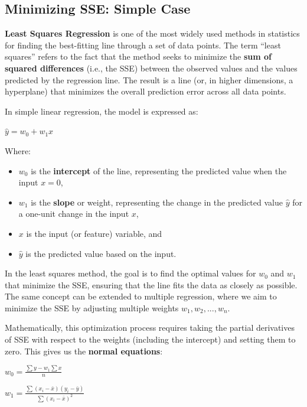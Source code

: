 \subsection{Minimizing SSE: Simple Case}
    \large \textbf{Least Squares Regression} is one of the most widely used methods in statistics for finding the best-fitting line through a set of data points. The term “least squares” refers to the fact that the method seeks to minimize the \textbf{sum of squared differences} (i.e., the SSE) between the observed values and the values predicted by the regression line. The result is a line (or, in higher dimensions, a hyperplane) that minimizes the overall prediction error across all data points.

    In simple linear regression, the model is expressed as:
    \begin{center}
        \( \hat{y} = w_0 + w_1x \)
    \end{center}
    Where:
    \begin{itemize}
        \item \( w_0 \) is the \textbf{intercept} of the line, representing the predicted value when the input \( x = 0 \),
        \item \( w_1 \) is the \textbf{slope} or weight, representing the change in the predicted value \( \hat{y} \) for a one-unit change in the input \( x \),
        \item \( x \) is the input (or feature) variable, and
        \item \( \hat{y} \) is the predicted value based on the input.
    \end{itemize}

    In the least squares method, the goal is to find the optimal values for \( w_0 \) and \( w_1 \) that minimize the SSE, ensuring that the line fits the data as closely as possible. The same concept can be extended to multiple regression, where we aim to minimize the SSE by adjusting multiple weights \( w_1, w_2, ..., w_n \).

    Mathematically, this optimization process requires taking the partial derivatives of SSE with respect to the weights (including the intercept) and setting them to zero. This gives us the \textbf{normal equations}:
    \begin{center}
        \( w_0 = \frac{\sum y - w_1\sum x}{n} \)
    \end{center}
    \begin{center}
        \( w_1 = \frac{\sum(x_i - \bar{x})(y_i - \bar{y})}{\sum(x_i - \bar{x})^2} \)
    \end{center}

